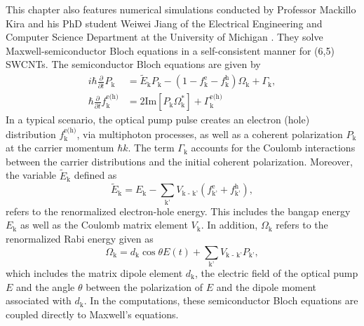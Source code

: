 This chapter also features numerical simulations conducted by Professor Mackillo Kira and his PhD student Weiwei Jiang of the Electrical Engineering and Computer Science Department at the University of Michigan \cite{mack2019}. They solve Maxwell-semiconductor Bloch equations \cite{kira2011semiconductor, hirtschulz2008carbon} in a self-consistent manner for (6,5) SWCNTs. The semiconductor Bloch equations are given by
%
\begin{equation}
	\begin{split}
	i \hbar \frac{\partial}{\partial t} P_\text{k} &= \tilde{E}_\text{k} P_\text{k} - ( 1- f^\text{e}_\text{k} - f^\text{h}_\text{k})\Omega_\text{k} + \Gamma_\text{k}, \\
	\hbar \frac{\partial }{\partial t} f_\text{k}^\text{e(h)} &= 2 \text{Im}[P_\text{k}\Omega_\text{k}^*] + \Gamma^\text{e(h)}_\text{k}
	\end{split}
\end{equation}
%
 In a typical scenario, the optical pump pulse creates an electron (hole) distribution $f_\text{k}^\text{e(h)}$, via multiphoton processes, as well as a coherent polarization $P_\text{k}$ at the carrier momentum $\hbar k$. The term $\Gamma_\text{k}$ accounts for the Coulomb interactions between the carrier distributions and the initial coherent polarization. Moreover, the variable $\tilde{E}_\text{k}$ defined as
%
\begin{equation}
	\tilde{E}_\text{k} = E_\text{k} - \sum_\text{k'} V_\text{k - k'} ( f_\text{k'}^\text{e} + f_\text{k'}^\text{h}),
\end{equation}
%
refers to the renormalized electron-hole energy. This includes the bangap energy $E_\text{k}$ as well as the Coulomb matrix element $V_\text{k}$. In addition, $\Omega_\text{k}$ refers to the renormalized Rabi energy given as
\begin{equation}
	\Omega_\text{k} = d_\text{k} \cos\theta E(t) + \sum_\text{k'} V_\text{k - k'} P_\text{k'},
\end{equation}
which includes the matrix dipole element $d_\text{k}$, the electric field of the optical pump $E$ and the angle $\theta$ between the polarization of $E$ and the dipole moment associated with $d_\text{k}$. In the computations, these semiconductor Bloch equations are coupled directly to Maxwell's equations.

